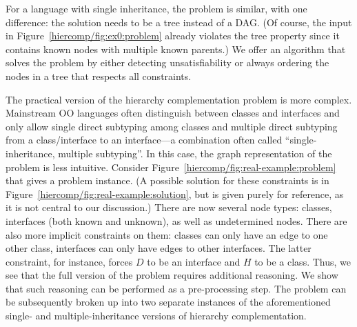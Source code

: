 For a language with single inheritance, the problem is similar, with
one difference: the solution needs to be a tree instead of a DAG. (Of
course, the input in Figure~\ref{hiercomp/fig:ex0:problem} already violates the
tree property since it contains known nodes with multiple known
parents.) We offer an algorithm that solves the problem by
either detecting unsatisfiability or always ordering the nodes in a
tree that respects all constraints.


The practical version of the hierarchy complementation problem is more
complex. Mainstream OO languages often distinguish between classes and
interfaces and only allow single direct subtyping among classes and
multiple direct subtyping from a class/interface to an interface---a
combination often called ``single-inheritance, multiple
subtyping''. In this case, the graph representation of the problem is
less intuitive. Consider Figure~\ref{hiercomp/fig:real-example:problem} that
gives a problem instance. (A possible solution for these constraints
is in Figure~\ref{hiercomp/fig:real-example:solution}, but is given purely for
reference, as it is not central to our discussion.) There are now
several node types: classes, interfaces (both known and unknown), as
well as undetermined nodes. There are also more implicit constraints
on them: classes can only have an edge to one other class, interfaces
can only have edges to other interfaces.  The latter constraint, for
instance, forces $D$ to be an interface and $H$ to be a class. Thus, we
see that the full version of the problem requires additional
reasoning. We show that such reasoning can be performed as a
pre-processing step. The problem can be subsequently broken up into
two separate instances of the aforementioned single- and
multiple-inheritance versions of hierarchy complementation.


